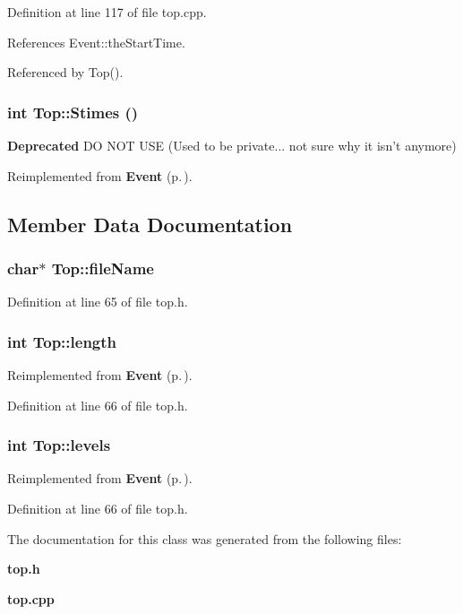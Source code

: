 Definition at line 117 of file top.cpp.

References Event::the\-Start\-Time.

Referenced by Top().
\subsubsection{\setlength{\rightskip}{0pt plus 5cm}int Top::Stimes ()\hspace{0.3cm}{\tt  [private]}}\label{classTop_d0}


\begin{Desc}
\item[{\bf Deprecated}]DO NOT USE (Used to be private... not sure why it isn't anymore) \end{Desc}


Reimplemented from {\bf Event} {\rm (p.\,\pageref{classEvent_a42})}.

\subsection{Member Data Documentation}
\subsubsection{\setlength{\rightskip}{0pt plus 5cm}char$\ast$ {\bf Top::file\-Name}\hspace{0.3cm}{\tt  [private]}}\label{classTop_r0}




Definition at line 65 of file top.h.
\subsubsection{\setlength{\rightskip}{0pt plus 5cm}int {\bf Top::length}\hspace{0.3cm}{\tt  [private]}}\label{classTop_r2}




Reimplemented from {\bf Event} {\rm (p.\,\pageref{classEvent_o20})}.

Definition at line 66 of file top.h.
\subsubsection{\setlength{\rightskip}{0pt plus 5cm}int {\bf Top::levels}\hspace{0.3cm}{\tt  [private]}}\label{classTop_r1}




Reimplemented from {\bf Event} {\rm (p.\,\pageref{classEvent_o19})}.

Definition at line 66 of file top.h.

The documentation for this class was generated from the following files:\begin{CompactItemize}
\item 
{\bf top.h}\item 
{\bf top.cpp}\end{CompactItemize}
